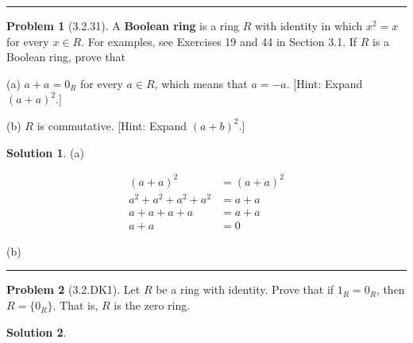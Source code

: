 \documentclass[12pt]{article}
\theoremstyle{definition}
\newtheorem*{prob}{Problem}
\newtheorem*{soln}{Solution}
\newcommand{\hr}{\vspace*{\parskip}\hrule}
\begin{document}
\hr

%
%


\begin{prob}[3.2.31]
A \textbf{Boolean ring} is a ring $R$ with identity in which 
$x^2 = x$ for every $x\in R$. For examples, see Exercises 19 and 44 in Section 3.1. 
If $R$ is a Boolean ring, prove that      

(a)   $a + a = 0_R$ for every $a\in R$, which means that $a = -a$. 
[Hint: Expand $(a + a)^2$.]     

(b) $R$ is commutative. [Hint: Expand $(a + b)^2$.]
\end{prob}

\begin{soln}

(a)

\begin{align*}
(a+a)^2&=(a+a)^2\\
a^2+a^2+a^2+a^2&=a+a\\
a+a+a+a&=a+a\\
a+a&=0
\end{align*}

(b)


\end{soln}

\hr

\begin{prob}[3.2.DK1]
Let $R$ be a ring with identity. Prove that if $1_R=0_R$, then
$R = \{ 0_R \}$. That is, $R$ is the zero ring.
\end{prob}

\begin{soln}

\end{soln}
\end{document}
